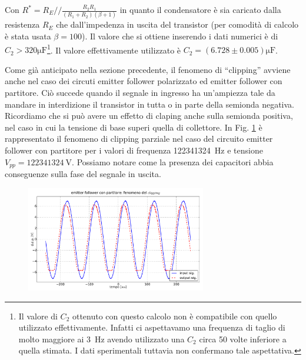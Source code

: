 Con $R^*=R_E//\frac{R_2R_1}{(R_1+R_2)(\beta +1)}$ in quanto il condensatore è sia caricato dalla resistenza $R_E$ che dall'impedenza in uscita del transistor (per comodità di calcolo è stata usata $\beta=100$). Il valore che si ottiene inserendo i dati numerici è di $C_2>320\si{\micro\farad}$\footnote{Il valore di $C_2$ ottenuto con questo calcolo non è compatibile con quello utilizzato effettivamente. Infatti ci aspettavamo una frequenza di taglio di molto maggiore ai \SI{3}{\hertz} avendo utilizzato una $C_2$ circa 50 volte inferiore a quella stimata. I dati sperimentali tuttavia non confermano tale aspettativa.}. Il valore effettivamente utilizzato è $C_2=(6.728 \pm 0.005)\si{\micro\farad}$. 


Come già anticipato nella sezione precedente, il fenomeno di ``clipping'' avviene anche nel caso dei circuti emitter follower polarizzato ed emitter follower con partitore.
Ciò succede quando il segnale in ingresso ha un'ampiezza tale da mandare in interdizione il transistor in tutta o in parte  della semionda negativa. Ricordiamo che si può avere un effetto di claping anche sulla semionda positiva, nel caso in cui la tensione di base superi quella di collettore. 
In Fig. \ref{fig:clip} è rappresentato il fenomeno di clipping parziale nel caso del circuito emitter follower con partitore per i valori di frequenza \SI{122341324}{\hertz} e tensione $V_{pp} = \SI{122341324}{\volt}$. Possiamo notare come la presenza dei capacitori abbia conseguenze sulla fase del segnale in uscita.


\begin{figure}[h]
\centering
	\includegraphics[width=0.7\textwidth]{clip.pdf}
	\caption{}
	\label{fig:clip}
\end{figure}